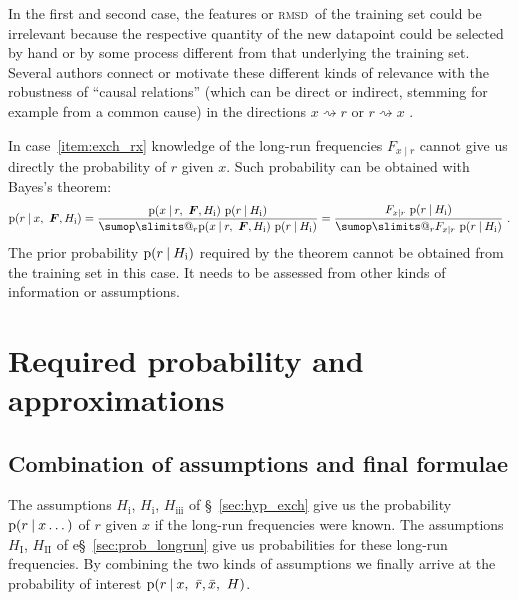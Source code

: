 \documentclass[\ifafour a4paper,12pt,\else a5paper,10pt,\fi%
onecolumn,oneside,article,%
british%
]{memoir}
\makeatletter
\theoremstyle{remark}
\theoremstyle{innote}
\def\sum{\DOTSI\sumop\slimits@}
\newcommand*{\p}{\mathrm{p}}%
\renewcommand*{\|}[1][]{\nonscript\:#1\vert\nonscript\:\mathopen{}}
\renewcommand*{\=}{\TextOrMath\texteq\eq}
\newcommand*{\sect}{\S}%
\newcommand*{\sects}{\S\S}%
\newcommand*{\cf}{{cf.}}
\newcommand*{\rmsd}{\textsc{rmsd}}
\newcommand*{\ro}{r}
\newcommand*{\xo}{x}
\newcommand*{\rd}{\bar{r}}
\newcommand*{\xd}{\bar{x}}
\newcommand*{\yF}{\bm{F}}
\makeatother
\begin{document}
In the first and second case, the features or \rmsd\ of the training set
could be irrelevant because the respective quantity of the new datapoint
could be selected by hand or by some process different from that underlying
the training set. Several authors connect or motivate these different kinds
of relevance with the robustness of \enquote{causal relations} (which can
be direct or indirect, stemming for example from a common cause) in the
directions $\xo \rightsquigarrow \ro$ or $\ro \rightsquigarrow \xo$
\parencites[\cf][\sects~2.1.2, 2.2.5]{pearl1988}.

In case~\ref{item:exch_rx} knowledge of the long-run frequencies
$F_{\xo\mid\ro}$ cannot give us directly the probability of $\ro$ given
$\xo$. Such probability can be obtained with Bayes's theorem:
\begin{equation}
  \label{eq:p_xr_bayes}
  \p(\ro \| \xo,\ \yF, H_{\textrm{i}}) =
  \frac{
    \p(\xo \| \ro,\ \yF, H_{\textrm{i}}) \ \p(\ro\| H_{\textrm{i}})
  }{
\sum_{r} \p(\xo \| r,\ \yF, H_{\textrm{i}}) \ \p(r\| H_{\textrm{i}})
} =
  \frac{ F_{\xo\mid\ro} \ \p(\ro\|  H_{\textrm{i}})
  }{ \sum_{r} F_{\xo\mid r} \ \p(r\| H_{\textrm{i}})} \ .
\end{equation}
The prior probability $\p(\ro\| H_{\textrm{i}})$ required by the theorem
cannot be obtained from the training set in this case. It needs to be
assessed from other kinds of information or assumptions.


\section{Required probability and approximations}
\label{sec:p_final_inference}

\subsection{Combination of assumptions and final formulae}
\label{sec:combinations_cases_inference}

The assumptions $H_{\textrm{i}}$, $H_{\textrm{i}}$, $H_{\textrm{iii}}$ of
\sect~\ref{sec:hyp_exch} give us the probability $\p(\ro \| \xo \dotsc)$ of
$\ro$ given $\xo$ if the long-run frequencies were known. The assumptions
$H_{\textrm{I}}$, $H_{\textrm{II}}$ of e\sect~\ref{sec:prob_longrun} give
us probabilities for these long-run frequencies. By combining the two kinds
of assumptions we finally arrive at the probability of interest
$\p(\ro \| \xo,\ \rd,\xd,\ H)$.
\end{document}
